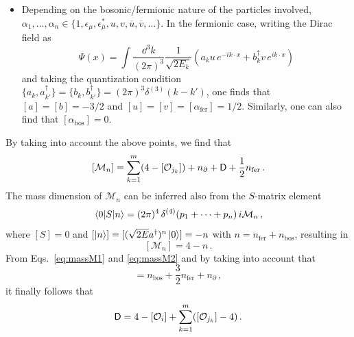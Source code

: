 \begin{subappendices}
\begin{itemize}
    \item Depending on the bosonic/fermionic nature of the particles involved, $\alpha_1,\dotsc, \alpha_{n} \in \{1,\epsilon_\mu,\epsilon_\mu^*,u,v,\overline u, \overline v,\dotsc\}$. In the fermionic case, writing the 
    Dirac field as
    \begin{equation}
     \Psi(x) = \int \frac{\dd^3k}{(2\pi)^3}  \frac{1}{\sqrt{2E_k}} 
     \left(a_k u \,e^{-ik\cdot x} + 
     b^\dagger_k v \,e^{ik\cdot x}\right)
    \end{equation}
    and taking the quantization condition $\{a_k,a^\dagger_{k'}\}=\{b_k,b^\dagger_{k'}\}=(2\pi)^3\delta^{(3)}(k-k')$, 
    one finds that $[a]=[b]=-3/2$ and 
    $[u]=[v]= [\alpha_{\text{fer}}]=1/2$. Similarly, one can also find that $[\alpha_{\text{bos}}] = 0$.
\end{itemize}
%
By taking into account the above points, we find that
\begin{equation}\label{eq:massM1}
    [\mathcal M_n] = \sum_{k=1}^m(4-[\mathcal{O}_{j_k}]) + n_\partial + \mathsf D +\frac{1}{2}n_{\text{fer}}\,.
\end{equation}    
The mass dimension of $\mathcal M_n$ can be inferred also from the $S$-matrix element
    \begin{equation}
    \mel{0}{S}{n} = (2\pi)^4 \, \delta^{(4)}(p_1+\dotsb+p_n) \, i \mathcal M_n\,,
\end{equation}
where $[S]=0$ and $[\ket{n}] = [(\sqrt{2E} a^\dagger)^n \ket{0}] = -n$ with $n = n_{\text{fer}} + n_{\text{bos}}$, resulting in
\begin{equation}\label{eq:massM2}
    [\mathcal M_{n}] = 4 - n\,.
\end{equation}
From Eqs.~\eqref{eq:massM1} and \eqref{eq:massM2} 
and by taking into account that
    \begin{equation}
    [\mathcal O_i] = n_{\text{bos}} + \frac{3}{2}n_{\text{fer}} + n_\partial\,,
\end{equation}
it finally follows that
    \begin{equation}
    \mathsf D = 4 - [\mathcal O_i] + \sum_{k=1}^m([\mathcal{O}_{j_k}]-4)\,. 
\end{equation}

\end{subappendices}